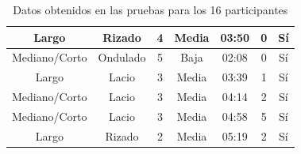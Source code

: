 \begin{table}[!htb]
{\begin{tabular}{|c|c|c|c|c|c|c|}
Largo                                                         & Rizado                                                   & 4                                                               & Media       & 03:50                                                & 0                                                             & Sí                                                           \\ \hline
Mediano/Corto                                                 & Ondulado                                                 & 5                                                               & Baja        & 02:08                                                & 0                                                             & Sí                                                           \\ \hline
Largo                                                         & Lacio                                                    & 3                                                               & Media       & 03:39                                                & 1                                                             & Sí                                                           \\ \hline
Mediano/Corto                                                 & Lacio                                                    & 3                                                               & Media       & 04:14                                                & 2                                                             & Sí                                                           \\ \hline
Mediano/Corto                                                 & Lacio                                                    & 3                                                               & Media       & 04:58                                                & 5                                                             & Sí                                                           \\ \hline
Largo                                                         & Rizado                                                   & 2                                                               & Media       & 05:19                                                & 2                                                             & Sí                                                           \\ \hline
\end{tabular}
}
\caption{Datos obtenidos en las pruebas para los 16 participantes}
\label{tab:relevantData}
\end{table}


